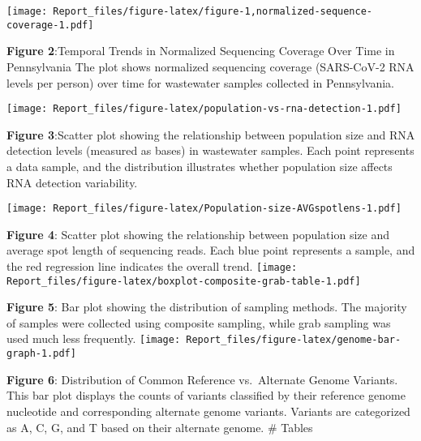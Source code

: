 \documentclass[
]{article}
\begin{document}
\texttt{[image: Report\_files/figure-latex/figure-1,normalized-sequence-coverage-1.pdf]}

\textbf{Figure 2}:Temporal Trends in Normalized Sequencing Coverage Over
Time in Pennsylvania The plot shows normalized sequencing coverage
(SARS-CoV-2 RNA levels per person) over time for wastewater samples
collected in Pennsylvania.

\texttt{[image: Report\_files/figure-latex/population-vs-rna-detection-1.pdf]}

\textbf{Figure 3}:Scatter plot showing the relationship between
population size and RNA detection levels (measured as bases) in
wastewater samples. Each point represents a data sample, and the
distribution illustrates whether population size affects RNA detection
variability.

\texttt{[image: Report\_files/figure-latex/Population-size-AVGspotlens-1.pdf]}

\textbf{Figure 4}: Scatter plot showing the relationship between
population size and average spot length of sequencing reads. Each blue
point represents a sample, and the red regression line indicates the
overall trend.
\texttt{[image: Report\_files/figure-latex/boxplot-composite-grab-table-1.pdf]}

\textbf{Figure 5}: Bar plot showing the distribution of sampling
methods. The majority of samples were collected using composite
sampling, while grab sampling was used much less frequently.
\texttt{[image: Report\_files/figure-latex/genome-bar-graph-1.pdf]}

\textbf{Figure 6}: Distribution of Common Reference vs.~Alternate Genome
Variants. This bar plot displays the counts of variants classified by
their reference genome nucleotide and corresponding alternate genome
variants. Variants are categorized as A, C, G, and T based on their
alternate genome. \# Tables
\end{document}
